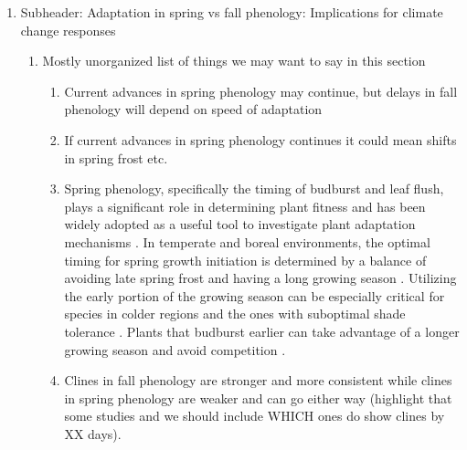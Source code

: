 \documentclass{article}
\begin{document}
\begin{enumerate}
 \item Subheader: Adaptation in spring vs fall phenology: Implications for climate change responses
 \begin{enumerate}
 \item Mostly unorganized list of things we may want to say in this section
 \begin{enumerate}
 \item Current advances in spring phenology may continue, but delays in fall phenology will depend on speed of adaptation
 \item If current advances in spring phenology continues it could mean shifts in spring frost etc.
  \item Spring phenology, specifically the timing of budburst and leaf flush, plays a significant role in determining plant fitness and has been widely adopted as a useful tool to investigate plant adaptation mechanisms \citep{guo22, chuine01}. In temperate and boreal environments, the optimal timing for spring growth initiation is determined by a balance of avoiding late spring frost and having a long growing season \citep{alberto11, lenz16, allevato19}. Utilizing the early portion of the growing season can be especially critical for species in colder regions \citep{morin07, dantec15} and the ones with suboptimal shade tolerance \citep{richardson09}. Plants that budburst earlier can take advantage of a longer growing season and avoid competition  \citep{guo22}.
 \item Clines in fall phenology are stronger and more consistent while clines in spring phenology are weaker and can go either way  (highlight that some studies and we should include WHICH ones do show clines by XX days).

\end{enumerate}
\end{enumerate}
\end{enumerate}
\end{document}
